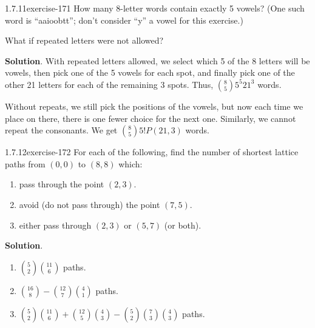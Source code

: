 \documentclass[twoside,11pt,]{book}
\numberwithin{equation}{chapter}
\begin{document}
\begin{divisionsolution}{1.7.11}{}{exercise-171}%
\hypertarget{p-2800}{}%
How many 8-letter words contain exactly 5 vowels? (One such word is ``aaioobtt''; don't consider ``y'' a vowel for this exercise.)%
\par
\hypertarget{p-2802}{}%
What if repeated letters were not allowed?%
\par\smallskip%
\noindent\textbf{Solution}.\quad%
\hypertarget{p-2804}{}%
With repeated letters allowed, we select which 5 of the 8 letters will be vowels, then pick one of the 5 vowels for each spot, and finally pick one of the other 21 letters for each of the remaining 3 spots. Thus, \({8 \choose 5}5^5 21^3\) words.%
\par
\hypertarget{p-2805}{}%
Without repeats, we still pick the positions of the vowels, but now each time we place on there, there is one fewer choice for the next one. Similarly, we cannot repeat the consonants. We get \({8 \choose 5}5!
P(21, 3)\) words.%
\end{divisionsolution}%
\begin{divisionsolution}{1.7.12}{}{exercise-172}%
\hypertarget{p-2814}{}%
For each of the following, find the number of shortest lattice paths from \((0,0)\) to \((8,8)\) which:\leavevmode%
\begin{enumerate}[label=(\alph*)]
\item\hypertarget{li-1658}{}\hypertarget{p-2815}{}%
pass through the point \((2,3)\text{.}\)%
\item\hypertarget{li-1659}{}\hypertarget{p-2817}{}%
avoid (do not pass through) the point \((7,5)\text{.}\)%
\item\hypertarget{li-1660}{}\hypertarget{p-2819}{}%
either pass through \((2,3)\) or \((5,7)\) (or both).%
\end{enumerate}
%
\par\smallskip%
\noindent\textbf{Solution}.\quad%
\hypertarget{p-2821}{}%
\leavevmode%
\begin{enumerate}[label=(\alph*)]
\item\hypertarget{li-1661}{}\hypertarget{p-2822}{}%
\({5 \choose 2}{11 \choose 6}\) paths.%
\item\hypertarget{li-1662}{}\hypertarget{p-2823}{}%
\({16 \choose 8} - {12 \choose 7}{4 \choose 1}\) paths.%
\item\hypertarget{li-1663}{}\hypertarget{p-2824}{}%
\({5 \choose 2}{11 \choose 6} + {12 \choose 5}{4 \choose 3} - {5 \choose 2}{7 \choose 3}{4 \choose 3}\) paths.%
\end{enumerate}
%
\end{divisionsolution}%
\end{document}
